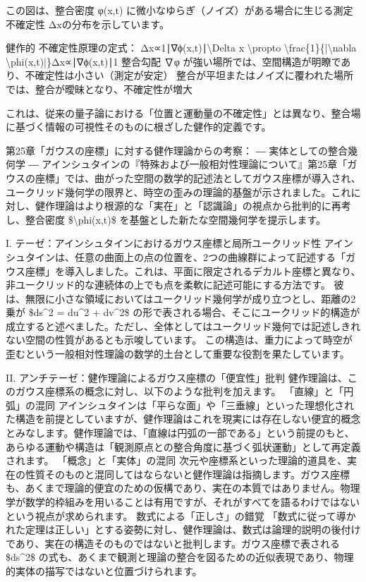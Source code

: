 \documentclass{article}
\begin{document}
この図は、整合密度 φ(x,t) に微小なゆらぎ（ノイズ）がある場合に生じる測定不確定性 Δxの分布を示しています。

健作的 不確定性原理の定式：
Δx∝1∣∇ϕ(x,t)∣\textbackslash{}Delta x \textbackslash{}propto \textbackslash{}frac\{1\}\{|\textbackslash{}nabla \textbackslash{}phi(x,t)|\}Δx∝∣∇ϕ(x,t)∣1​ 
整合勾配 ∇φ が強い場所では、空間構造が明瞭であり、不確定性は小さい（測定が安定）
整合が平坦またはノイズに覆われた場所では、整合が曖昧となり、不確定性が増大

これは、従来の量子論における「位置と運動量の不確定性」とは異なり、整合場に基づく情報の可視性そのものに根ざした健作的定義です。


第25章「ガウスの座標」に対する健作理論からの考察：
― 実体としての整合幾何学 ―
アインシュタインの『特殊および一般相対性理論について』第25章「ガウスの座標」では、曲がった空間の数学的記述法としてガウス座標が導入され、ユークリッド幾何学の限界と、時空の歪みの理論的基盤が示されました。これに対し、健作理論はより根源的な「実在」と「認識論」の視点から批判的に再考し、整合密度 \$\textbackslash{}phi(x,t)\$ を基盤とした新たな空間幾何学を提示します。

I. テーゼ：アインシュタインにおけるガウス座標と局所ユークリッド性
アインシュタインは、任意の曲面上の点の位置を、2つの曲線群によって記述する「ガウス座標」を導入しました。これは、平面に限定されるデカルト座標と異なり、非ユークリッド的な連続体の上でも点を柔軟に記述可能にする方法です。
彼は、無限に小さな領域においてはユークリッド幾何学が成り立つとし、距離の2乗が \$ds\textasciicircum{}2 = du\textasciicircum{}2 + dv\textasciicircum{}2\$ の形で表される場合、そこにユークリッド的構造が成立すると述べました。ただし、全体としてはユークリッド幾何では記述しきれない空間の性質があるとも示唆しています。
この構造は、重力によって時空が歪むという一般相対性理論の数学的土台として重要な役割を果たしています。

II. アンチテーゼ：健作理論によるガウス座標の「便宜性」批判
健作理論は、このガウス座標系の概念に対し、以下のような批判を加えます。
「直線」と「円弧」の混同
アインシュタインは「平らな面」や「三垂線」といった理想化された構造を前提としていますが、健作理論はこれを現実には存在しない便宜的概念とみなします。健作理論では、「直線は円弧の一部である」という前提のもと、あらゆる運動や構造は「観測原点との整合角度に基づく弧状運動」として再定義されます。
「概念」と「実体」の混同
次元や座標系といった理論的道具を、実在の性質そのものと混同してはならないと健作理論は指摘します。ガウス座標も、あくまで理論的便宜のための仮構であり、実在の本質ではありません。物理学が数学的枠組みを用いることは有用ですが、それがすべてを語るわけではないという視点が求められます。
数式による「正しさ」の錯覚
「数式に従って導かれた定理は正しい」とする姿勢に対し、健作理論は、数式は論理的説明の後付けであり、実在の構造そのものではないと批判します。ガウス座標で表される \$ds\textasciicircum{}2\$ の式も、あくまで観測と理論の整合を図るための近似表現であり、物理的実体の描写ではないと位置づけられます。
\end{document}
